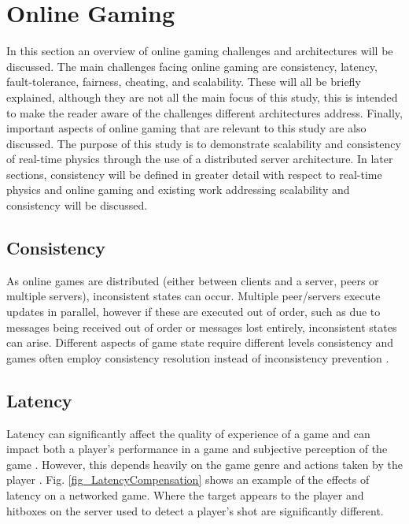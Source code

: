 \section{Online Gaming}
In this section an overview of online gaming challenges and architectures will be discussed. 
The main challenges facing online gaming are consistency, latency, fault-tolerance, fairness, cheating, and scalability. 
These will all be briefly explained, although they are not all the main focus of this study, this is intended to make the reader aware of the challenges different architectures address. Finally, important aspects of online gaming that are relevant to this study are also discussed. The purpose of this study is to demonstrate scalability and consistency of real-time physics through the use of a distributed server architecture. In later sections, consistency will be defined in greater detail with respect to real-time physics and online gaming and existing work addressing scalability and consistency will be discussed. 

\subsection{Consistency}
As online games are distributed (either between clients and a server, peers or multiple servers), inconsistent states can occur. Multiple peer/servers execute updates in parallel, however if these are executed out of order, such as due to messages being received out of order or messages lost entirely, inconsistent states can arise.  Different aspects of game state require different levels consistency and games often employ consistency resolution instead of inconsistency prevention \cite{P2PForMMOs}.


\subsection{Latency}
Latency can significantly affect the quality of experience of a game and can impact both a player's performance in a game \cite{EffectsofLossandLatency, claypool2010latency} and subjective perception of the game \cite{dick2005analysis}. However, this depends heavily on the game genre and actions taken by the player \cite{LatencyandPlayerActions, claypool2010latency}. Fig. \ref{fig_LatencyCompensation} shows an example of the effects of latency on a networked game. Where the target appears to the player and hitboxes on the server used to detect a player's shot are significantly different.

